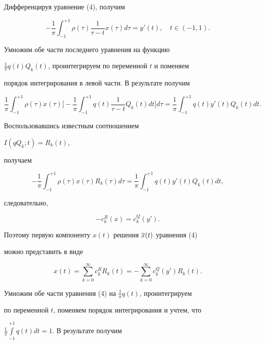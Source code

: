 \begin{pf}


Дифференцируя уравнение (4), получим


$$


-\frac{1}{\pi}\int_{-1}^{+1}\rho(\tau)\frac{1}{\tau-t}x(\tau)d\tau =


y'(t),\quad t\in (-1,1).


$$


Умножим обе части последнего уравнения на функцию


$\frac{1}{\pi}q(t)Q_k(t)$, проинтегрируем по переменной $t$ и поменяем 


порядок интегрирования в левой части. В результате получим


$$


\frac{1}{\pi}\int_{-1}^{+1}\rho(\tau)x(\tau)\bigg[


-\frac{1}{\pi}\int_{-1}^{+1}q(t)\frac{1}{\tau-t}Q_k(t)dt\bigg]d\tau =


\frac{1}{\pi}\int_{-1}^{+1}q(t)y'(t)Q_k(t)dt.


$$


Воспользовавшись известным соотношением


$I(qQ_k;t) = R_k(t)$,


получаем


$$


-\frac{1}{\pi}\int_{-1}^{+1} \rho(\tau)x(\tau)R_k(\tau)d\tau =


\frac{1}{\pi}\int_{-1}^{+1}q(t)y'(t)Q_k(t)dt,


$$


следовательно,


\begin{equation}


-c_k^R(x) = c_k^Q(y').


\end{equation}


Поэтому первую компоненту $x(t)$ решения $\overline{x}(t)$ уравнения (4) 


можно представить в виде


$$


x(t) = \sum_{k=0}^\infty c_k^R R_k(t) = -\sum_{k=0}^\infty c_k^Q(y')R_k(t).


$$


Умножим обе части уравнения (4) на $\frac{1}{\pi}q(t)$, проинтегрируем 


по переменной $t$, поменяем порядок интегрирования и учтем, что


$\frac{1}{\pi}\int\limits_{-1}^{+1}q(t)dt =1$. В результате получим



\end{pf}
